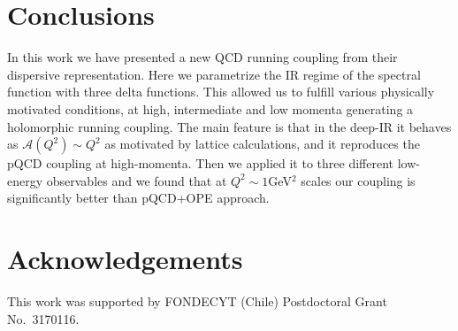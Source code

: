 \documentclass[3p,times,twocolumn]{elsarticle}
\newcommand{\A}{{\mathcal{A}}}
\begin{document}
\section{Conclusions}

In this work we have presented a new QCD running coupling from their 
dispersive representation. Here we parametrize the IR regime of the spectral function with three delta functions. This allowed us to fulfill various physically motivated conditions, at high, intermediate and low momenta generating a holomorphic running coupling. The main feature is that in the deep-IR it behaves as $\A(Q^2)\sim Q^2$ as motivated by lattice calculations, and it reproduces the pQCD coupling at high-momenta.
Then we applied it to three different low-energy observables and we found that at $Q^2\sim1$GeV$^2$ scales our coupling is significantly better than pQCD+OPE approach. 

\section*{Acknowledgements}
This work was supported by FONDECYT (Chile) Postdoctoral Grant No.~3170116. 
\end{document}
